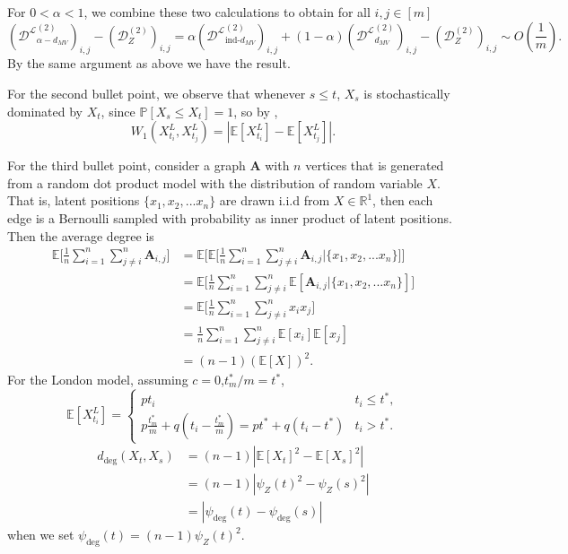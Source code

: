 \documentclass[12pt]{article}
\newcommand{\EE}{\mathbb{E}}
\newcommand{\PP}{\mathbb{P}}
\theoremstyle{definition}
\newcommand{\R}{\mathbb{R}}
\newcommand{\bA}{\mathbf{A}}
\begin{document}
For $0<\alpha<1$, we combine these two calculations to obtain for all $i,j\in[m]$
$$
(\mathcal{D^L}^{(2)}_{\alpha-d_{MV}})_{i,j} - (\mathcal{D}^{(2)}_Z)_{i,j} = \alpha (\mathcal{D^L}^{(2)}_{\text{ind-}d_{MV}})_{i,j} + (1-\alpha)(\mathcal{D^L}^{(2)}_{d_{MV}})_{i,j} - (\mathcal{D}_Z^{(2)})_{i,j} \sim O\left(\frac{1}{m}\right).
$$
By the same argument as above we have the result. 

For the second bullet point, we observe that whenever $s\leq t$, $X_s$ is stochastically dominated by $X_t$, since $\PP[X_s\leq X_t]=1$, so by \cite{de20211}, 
$$
W_1(X^L_{t_i},X^L_{t_j}) = |\EE [X^L_{t_i}] - \EE[X^L_{t_j}]|.
$$

For the third bullet point, consider a graph $\bA$ with $n$ vertices that is generated from a random dot product model with the distribution of random variable $X$. That is, latent positions $\{x_1, x_2, ... x_n\}$ are drawn i.i.d from $X \in \R^1$, then each edge is a Bernoulli sampled with probability as inner product of latent positions. Then the average degree is 
\begin{align*}
\EE \biggl[ \frac{1}{n} \sum^n_{i =1} \sum^n_{j \neq i} \bA_{i,j} \biggr] & = 
\EE \biggl[  \EE \biggl[ \frac{1}{n} \sum^n_{i =1} \sum^n_{j \neq i} \bA_{i,j} | \{x_1, x_2, ... x_n\}  \biggr] \biggr]  \\
& =
\EE \biggl[   \frac{1}{n} \sum^n_{i =1} \sum^n_{j \neq i} \EE[\bA_{i,j} | \{x_1, x_2, ... x_n\}]   \biggr] \\ 
& = 
\EE \biggl[   \frac{1}{n} \sum^n_{i =1} \sum^n_{j \neq i} x_i x_j  \biggr]  \\
& = 
\frac{1}{n} \sum^n_{i =1} \sum^n_{j \neq i} \EE[x_i] \EE[x_j]  \\
& = (n-1) \left(\EE[X]\right)^2.
\end{align*}
For the London model, assuming $c=0$,$t^*_m/m = t^*$,
$$
\EE[X^L_{t_i}] = \begin{cases}
p t_i & t_i \le t^*, \\
p \frac{t^*_m}{m} + q(t_i - \frac{t^*_m}{m}) = p t^* + q(t_i - t^*) & t_i > t^*.
\end{cases}
$$
\begin{align*}
d_{\mathrm{deg}}(X_t,X_s)&=(n-1)|\EE[X_t]^2-\EE[X_s]^2|\\
    &=(n-1)|\psi_Z(t)^2-\psi_Z(s)^2|\\
    &=|\psi_{\mathrm{deg}}(t)-\psi_{\mathrm{deg}}(s)|
\end{align*}
when we set $\psi_{\mathrm{deg}}(t)=(n-1)\psi_Z(t)^2$.
\end{document}
